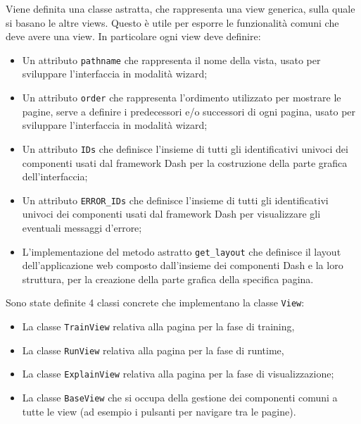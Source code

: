 Viene definita una classe astratta, che rappresenta una view generica, sulla quale si basano le altre views. Questo è utile per esporre le funzionalità comuni che deve avere una view.
In particolare ogni view deve definire:

\begin{itemize}

\item Un attributo \texttt{pathname} che rappresenta il nome della vista, usato per sviluppare l'interfaccia in modalità wizard;

\item Un attributo \texttt{order} che rappresenta l'ordimento utilizzato per mostrare le pagine, serve a definire i predecessori e/o successori di ogni pagina, usato per sviluppare l'interfaccia in modalità wizard;

\item Un attributo \texttt{IDs} che definisce l'insieme di tutti gli identificativi univoci dei componenti usati dal framework Dash per la costruzione della parte grafica dell'interfaccia; 

\item Un attributo \texttt{ERROR\_IDs} che definisce l'insieme di tutti gli identificativi univoci dei componenti usati dal framework Dash per visualizzare gli eventuali messaggi d'errore; 

\item L'implementazione del metodo astratto \texttt{get\_layout} che definisce il layout dell'applicazione web composto dall'insieme dei componenti Dash e la loro struttura, per la creazione della parte grafica della specifica pagina.

\end{itemize}

Sono state definite 4 classi concrete che implementano la classe \texttt{View}:
\begin{itemize}
\item La classe \texttt{TrainView} relativa alla pagina per la fase di training, 
\item La classe \texttt{RunView} relativa alla pagina per la fase di runtime, 
\item La classe \texttt{ExplainView} relativa alla pagina per la fase di visualizzazione;
\item La classe \texttt{BaseView} che si occupa della gestione dei componenti comuni a tutte le view (ad esempio i pulsanti per navigare tra le pagine).
\end{itemize}


